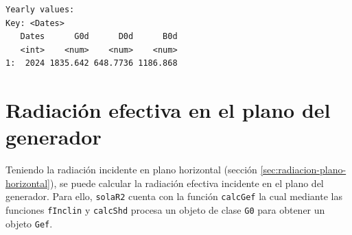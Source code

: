 \begin{itemize}
\begin{verbatim}
Yearly values:
Key: <Dates>
   Dates      G0d      D0d      B0d
   <int>    <num>    <num>    <num>
1:  2024 1835.642 648.7736 1186.868
\end{verbatim}
\end{itemize}

\section{Radiación efectiva en el plano del generador}
\label{sec:org26d4467}
\label{sec:radiacion-efectiva-plano-generador}
Teniendo la radiación incidente en plano horizontal (sección \ref{sec:radiacion-plano-horizontal}), se puede calcular la radiación efectiva incidente en el plano del generador. Para ello, \texttt{solaR2} cuenta con la función \texttt{calcGef} la cual mediante las funciones \texttt{fInclin} y \texttt{calcShd} procesa un objeto de clase \texttt{G0} para obtener un objeto \texttt{Gef}.

